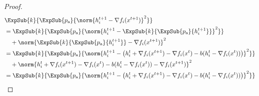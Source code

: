 \documentclass{article}
\newcommand*{\probavailable}{\ensuremath{p_{\textnormal{a}}}}
\begin{document}
\begin{proof}
  \begin{align*}
    &\ExpSub{k}{\ExpSub{\probavailable}{\norm{h^{t+1}_i - \nabla f_i(x^{t+1})}^2}} \\
    &=\ExpSub{k}{\ExpSub{\probavailable}{\norm{h^{t+1}_i - \ExpSub{k}{\ExpSub{\probavailable}{h^{t+1}_i}}}^2}} \\
    &\quad + \norm{\ExpSub{k}{\ExpSub{\probavailable}{h^{t+1}_i}} - \nabla f_i(x^{t+1})}^2 \\
    &=\ExpSub{k}{\ExpSub{\probavailable}{\norm{h^{t+1}_i - \left(h^{t}_i + \nabla f_i(x^{t+1}) - \nabla f_i(x^{t}) - b(h^t_i - \nabla f_i(x^{t}))\right)}^2}} \\
    &\quad + \norm{h^{t}_i + \nabla f_i(x^{t+1}) - \nabla f_i(x^{t}) - b(h^t_i - \nabla f_i(x^{t})) - \nabla f_i(x^{t+1})}^2 \\
    &=\ExpSub{k}{\ExpSub{\probavailable}{\norm{h^{t+1}_i - \left(h^{t}_i + \nabla f_i(x^{t+1}) - \nabla f_i(x^{t}) - b(h^t_i - \nabla f_i(x^{t}))\right)}^2}} \\

\end{align*}
\end{proof}
\end{document}
